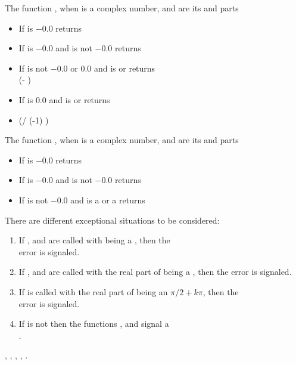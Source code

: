 \documentclass[../Exponentials-Logarithms-Trigonometry.tex]{subfiles}
\begin{document}
\noindent
The function , when  is a complex number, 
and  are its  and  parts
\begin{itemize}
\item If  is $-0.0$ returns 
\item If  is $-0.0$ and  is not
  $-0.0$ returns \code{)))}
\item If  is not $-0.0$ or $0.0$ and
   is  or  returns\\
   \code{)} (- )\code{))}
\item If  is $0.0$ and  is
   or  returns
\item {}(/ (-1) )\code{)}
\end{itemize}

\noindent
The function , when  is a complex number, 
and  are its  and  parts
\begin{itemize}
\item If  is $-0.0$ returns 
\item If  is $-0.0$ and  is not
  $-0.0$ returns \code{))))}
\item If  is not $-0.0$ and  is a
   or a  returns\\
  \code{))}
\end{itemize}

\DExceptional{}

There are different exceptional situations to be considered:
\begin{enumerate}
\item If ,  and  are called with
   being a , then the\\
   error is signaled.
\item If ,  and  are called with the real
  part of  being a , then the
   error is signaled.
\item If  is called with the real part of
   being an $\pi/2 + k\pi$, then the\\
   error is signaled.
\item If  is not \CL{}
   then the functions ,  and
   signal a\\
  .
\end{enumerate}

\DSeeAlso{}

\code{*}, \code{-}, , , .
\end{document}
